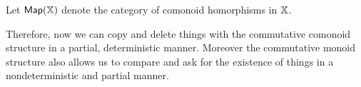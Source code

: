 \begin{definition}
Let ${\sf Map}(\mathbb{X})$ denote the category of comonoid homorphisms in $\mathbb{X}$.
\end{definition}
Therefore, now we can copy and delete things with the commutative comonoid structure in a partial, deterministic manner. Moreover the commutative monoid structure also allows us to  compare and ask for the existence of things in a nondeterministic and partial manner.


